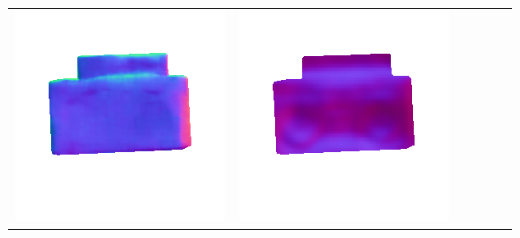 \begin{tabularx}{\linewidth}{@{}Y@{}Y@{}Y@{}Y@{}Y@{}Y@{}}
\includegraphics[width=\linewidth]{semisynthetic/20160617_19_marrnet_out.png} &
\includegraphics[width=\linewidth]{semisynthetic/20160617_19_ef_out.png} \\

\end{tabularx}
